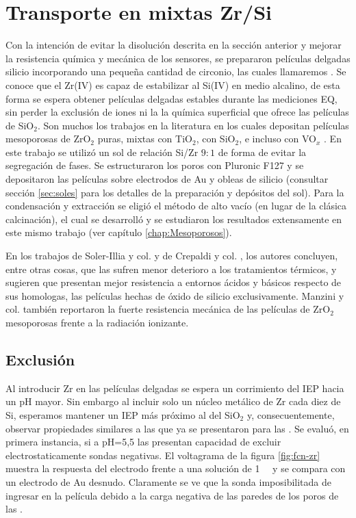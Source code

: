 	\section{Transporte en \pdm\space mixtas Zr/Si}

			Con la intención de evitar la disolución descrita en la sección anterior y mejorar la resistencia química y mecánica de los sensores, se prepararon películas delgadas silicio incorporando una pequeña cantidad de circonio, las cuales llamaremos \pdmZ. Se conoce que el Zr(IV) es capaz de estabilizar al Si(IV) en medio alcalino\cite{Soler-Illia2004}, de esta forma se espera obtener películas delgadas estables durante las mediciones EQ, sin perder la exclusión de iones ni la la química superficial que ofrece las películas de SiO$_2$. Son muchos los trabajos en la literatura en los cuales depositan películas mesoporosas de ZrO$_2$ puras, mixtas con TiO$_2$, con SiO$_2$, e incluso con VO$_x$ \cite{Soler-Illia2004,Crepaldi2002a,Gimenez2016,Zelcer2013,Calvo20210,Angelome2008}. En este trabajo se utilizó un sol de relación Si/Zr $9\!:\!1$ de forma de evitar la segregación de fases\cite{Soler-Illia2004}. Se estructuraron los poros con Pluronic F127 y se depositaron las películas sobre electrodos de Au y obleas de silicio (consultar sección \ref{sec:soles} para los detalles de la preparación y depósitos del sol). Para la condensación y extracción se eligió el método de alto vacío (en lugar de la clásica calcinación), el cual se desarrolló y se estudiaron los resultados extensamente en este mismo trabajo (ver capítulo \ref{chap:Mesoporosos}).

			En los trabajos de Soler-Illia y col.\cite{Soler-Illia2004} y de Crepaldi y col. \cite{Crepaldi2002a}, los autores concluyen, entre otras cosas, que las \pdmZ\space sufren menor deterioro a los tratamientos térmicos, y sugieren que presentan mejor resistencia a entornos ácidos y básicos respecto de sus homologas, las películas hechas de óxido de silicio exclusivamente. Manzini y col.\cite{Gimenez2016} también reportaron la fuerte resistencia mecánica de las películas de ZrO$_2$ mesoporosas frente a la radiación ionizante.

	 \subsection{Exclusión}

	 	 Al introducir Zr en las películas delgadas se espera un corrimiento del IEP hacia un pH mayor\cite{Kosmulski2014}. Sin embargo al incluir solo un núcleo metálico de Zr cada diez de Si, esperamos mantener un IEP más próximo al del SiO$_2$ y, consecuentemente, observar propiedades similares a las que ya se presentaron para las \pdmF.
	 	 Se evaluó, en primera instancia, si a pH=5,5 las \pdmZ\space presentan capacidad de excluir electrostaticamente sondas negativas. El voltagrama de la figura \ref{fig:fcn-zr} muestra la respuesta del electrodo frente a una solución de \fe\space \SI{1}{\milli\Molar} y se compara con un electrodo de Au desnudo. Claramente se ve que la sonda imposibilitada de ingresar en la película debido a la carga negativa de las paredes de los poros de las \pdmZ. 
				
